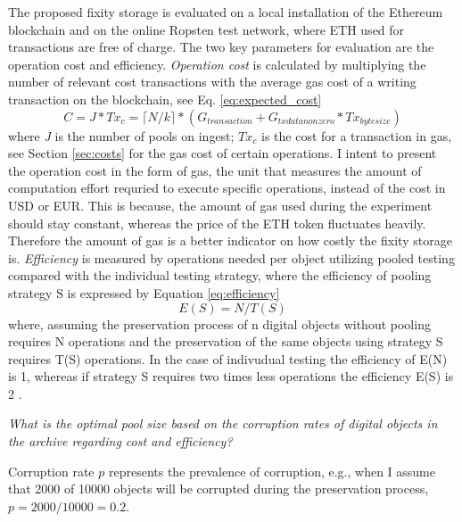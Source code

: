 The proposed fixity storage is evaluated on a local installation of the Ethereum blockchain and on the online Ropsten test network, where ETH used for transactions are free of charge.
The two key parameters for evaluation are the operation cost and efficiency. 
\textit{Operation cost} is calculated by multiplying the number of relevant cost transactions with the average gas cost of a writing transaction on the blockchain, see Eq. \ref{eq:expected_cost}
\begin{equation}\label{eq:expected_cost}
    C = J * Tx_c = \lceil N/k \rceil * (G_{transaction} + G_{txdatanonzero}*Tx_{bytesize})
\end{equation}
where \textit{J} is the number of pools on ingest; \textit{$Tx_c$} is the cost for a transaction in gas, see Section \ref{sec:costs} for the gas cost of certain operations.
I intent to present the operation cost in the form of gas, the unit that measures the amount of computation effort requried to execute specific operations, instead of the cost in USD or EUR. This is because, the amount of gas used during the experiment should stay constant, whereas the price of the ETH token fluctuates heavily. Therefore the amount of gas is a better indicator on how costly the fixity storage is.
\textit{Efficiency} is measured by operations needed per object utilizing pooled testing compared with the individual testing strategy, where the efficiency of pooling strategy S is expressed by Equation \ref{eq:efficiency}
\begin{equation}\label{eq:efficiency}
    E(S) = N/T(S)
\end{equation}
where, assuming the preservation process of n digital objects without pooling requires N operations and the preservation of the same objects using strategy S requires T(S) operations. In the case of indivudual testing the efficiency of E(N) is 1, whereas if strategy S requires two times less operations the efficiency E(S) is 2 \cite[4]{vzilinskas2021pooled}.

\textit{What is the optimal pool size based on the corruption rates of digital objects in the archive regarding cost and efficiency?}

Corruption rate $p$ represents the prevalence of corruption, e.g., when I assume that 2000 of 10000 objects will be corrupted during the preservation process, $p = 2000/10000 = 0.2$. 

